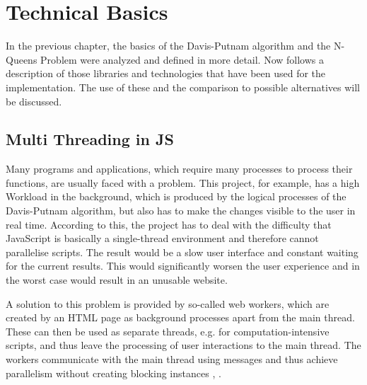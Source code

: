 

\chapter{Technical Basics}
\label{ch:tecBasics}
In the previous chapter, the basics of the Davis-Putnam algorithm and the N-Queens Problem were analyzed and defined in more detail. Now follows a description of those libraries and technologies that have been used for the implementation. The use of these and the comparison to possible alternatives will be discussed. 

\section{Multi Threading in JS}
\label{sec:tecWorker}
Many programs and applications, which require many processes to process their functions, are usually faced with a problem. This project, for example, has a high Workload in the background, which is produced by the logical processes of the Davis-Putnam algorithm, but also has to make the changes visible to the user in real time. According to this, the project has to deal with the difficulty that JavaScript is basically a single-thread environment and therefore cannot parallelise scripts. The result would be a slow user interface and constant waiting for the current results. This would significantly worsen the user experience and in the worst case would result in an unusable website.

A solution to this problem is provided by so-called web workers, which are created by an HTML page as background processes apart from the main thread. These can then be used as separate threads, e.g. for computation-intensive scripts, and thus leave the processing of user interactions to the main thread. The workers communicate with the main thread using messages and thus achieve parallelism without creating blocking instances \cite{Peng2017}, \cite{Bidelman2010}. 

